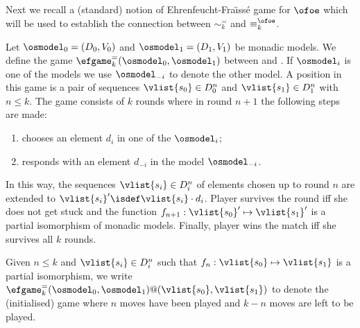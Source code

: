 Next we recall a (standard) notion of Ehrenfeucht-Fra\"{\i}ss\'e game for 
$\ofoe$ which will be used to establish the connection between ${\sim^=_k}$ and 
$\equiv_k^{\ofoe}$.

\begin{definition}
Let $\osmodel_0 = (D_0,V_0)$ and $\osmodel_1 = (D_1,V_1)$ be monadic models. 
We define the game $\efgame^=_k(\osmodel_0,\osmodel_1)$ between \abelard and 
\eloise.
If $\osmodel_i$ is one of the models we use $\osmodel_{-i}$ to denote the other
model. 
A position in this game is a pair of sequences $\vlist{s_0} \in D_0^n$ and 
$\vlist{s_1} \in D_1^n$ with $n \leq k$. 
The game consists of $k$ rounds where in round $n+1$ the following steps are 
made:
\begin{enumerate}[1.]
 pt  pt
\item \abelard chooses an element $d_i$ in one of the $\osmodel_i$;
\item \eloise responds with an element $d_{-i}$ in the model $\osmodel_{-i}$.
\end{enumerate}
%
In this way, the sequences $\vlist{s_i} \in D_i^n$ of elements chosen up to 
round $n$ are extended to ${\vlist{s_i}' \isdef  \vlist{s_i}\cdot d_i}$. 
Player \eloise survives the round iff she does not get stuck and the function
$f_{n+1}: \vlist{s_0}' \mapsto \vlist{s_1}'$ is a partial isomorphism of monadic 
models. 
Finally, player \eloise wins the match iff she survives all $k$ rounds.

Given $n\leq k$ and $\vlist{s_i} \in D_i^n$ such that $f_n:\vlist{s_0}\mapsto
\vlist{s_1}$ is a partial isomorphism, we write $\efgame_{k}^=(\osmodel_0,
\osmodel_1)@(\vlist{s_0},\vlist{s_1})$ to denote the (initialised) game where 
$n$ moves have been played and $k-n$ moves are left to be played.
\end{definition}

